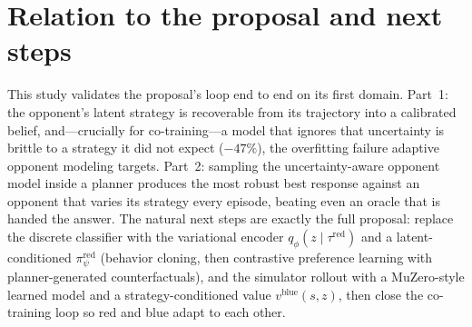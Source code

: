 \documentclass[11pt]{article}
\newcommand{\red}[1]{\textcolor{red1}{#1}}
\newcommand{\blue}[1]{\textcolor{blue1}{#1}}
\newcommand{\tred}{\tau^{\mathrm{red}}}
\newcommand{\zlat}{z}
\begin{document}
\section{Relation to the proposal and next steps}

This study validates the proposal's loop end to end on its first domain. Part~1:
the opponent's latent strategy is recoverable from its trajectory into a
calibrated belief, and---crucially for co-training---a model that ignores that
uncertainty is brittle to a strategy it did not expect ($-47\%$), the overfitting
failure adaptive opponent modeling targets. Part~2: sampling the
uncertainty-aware opponent model inside a planner produces the most robust best
response against an opponent that varies its strategy every episode, beating even
an oracle that is handed the answer. The natural next steps are exactly the full
proposal: replace the discrete classifier with the variational encoder
$q_\phi(\zlat\mid\tred)$ and a latent-conditioned $\pi^{\mathrm{red}}_\psi$
(behavior cloning, then contrastive preference learning with planner-generated
counterfactuals), and the simulator rollout with a MuZero-style learned model and
a strategy-conditioned value $v^{\mathrm{blue}}(s,\zlat)$, then close the
co-training loop so \red{red} and \blue{blue} adapt to each other.
\end{document}
